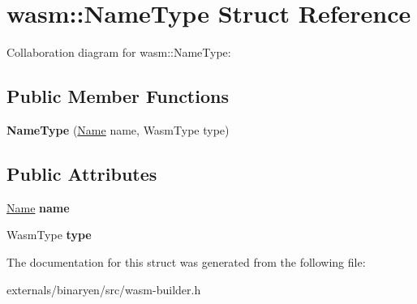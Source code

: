\hypertarget{structwasm_1_1_name_type}{}\section{wasm\+:\+:Name\+Type Struct Reference}
\label{structwasm_1_1_name_type}


Collaboration diagram for wasm\+:\+:Name\+Type\+:
\subsection*{Public Member Functions}
\begin{DoxyCompactItemize}
\item 
\mbox{\label{structwasm_1_1_name_type_aae72483eafe7474690cbe5e8c8942229}} 
{\bfseries Name\+Type} (\mbox{\hyperlink{structwasm_1_1_name}{Name}} name, Wasm\+Type type)
\end{DoxyCompactItemize}
\subsection*{Public Attributes}
\begin{DoxyCompactItemize}
\item 
\mbox{\label{structwasm_1_1_name_type_a5639d0c389af402a9b1557fab7878f23}} 
\mbox{\hyperlink{structwasm_1_1_name}{Name}} {\bfseries name}
\item 
\mbox{\label{structwasm_1_1_name_type_a56e1e0e8cf03bcf78316a87855be8eb9}} 
Wasm\+Type {\bfseries type}
\end{DoxyCompactItemize}


The documentation for this struct was generated from the following file\+:\begin{DoxyCompactItemize}
\item 
externals/binaryen/src/wasm-\/builder.\+h\end{DoxyCompactItemize}
